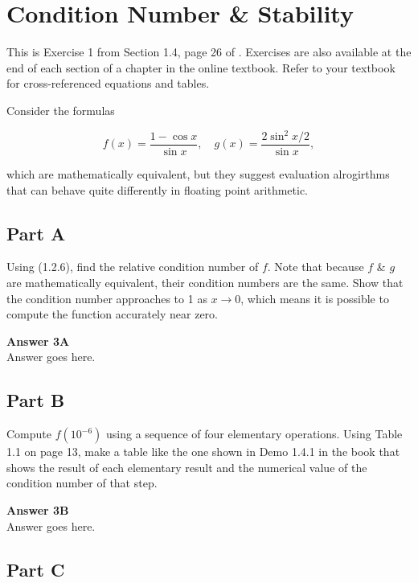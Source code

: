 \documentclass{article}
\begin{document}
\section{Condition Number \& Stability}

This is Exercise 1 from Section 1.4, page 26 of \cite{driscoll}. Exercises are also available at the end of each section of a chapter in the online textbook. Refer to your textbook for cross-referenced equations and tables.

Consider the formulas

\begin{equation}
f(x) = \frac{1 - \cos x}{\sin x},
  \quad
  g(x) = \frac{2 \sin^2 x/2}{\sin x},
\end{equation}

which are mathematically equivalent, but they suggest evaluation alrogirthms that can behave quite differently in floating point arithmetic.

\subsection{Part A}

Using (1.2.6), find the relative condition number of $f$. Note that because $f$ \& $g$ are mathematically equivalent, their condition numbers are the same. Show that the condition number approaches to 1 as $x \to 0$, which means it is possible to compute the function accurately near zero.

\begin{framed}
\textbf{Answer 3A}\\
Answer goes here.
\end{framed}

\subsection{Part B}

Compute $f(10^{ -6})$ using a sequence of four elementary operations. Using Table 1.1 on page 13, make a table like the one shown in Demo 1.4.1 in the book that shows the result of each elementary result and the numerical value of the condition number of that step.

\begin{framed}
\textbf{Answer 3B}\\
Answer goes here.
\end{framed}

\subsection{Part C}
\end{document}
